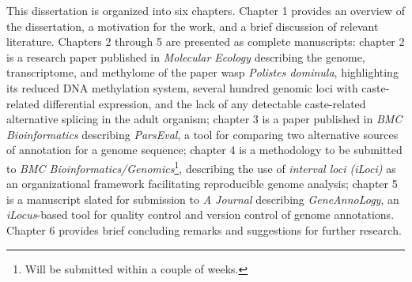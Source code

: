 This dissertation is organized into six chapters.
Chapter 1 provides an overview of the dissertation, a motivation for the work, and a brief discussion of relevant literature.
Chapters 2 through 5 are presented as complete manuscripts:
chapter 2 is a research paper published in \textit{Molecular Ecology} describing the genome, transcriptome, and methylome of the paper wasp \textit{Polistes dominula}, highlighting its reduced DNA methylation system, several hundred genomic loci with caste-related differential expression, and the lack of any detectable caste-related alternative splicing in the adult organism;
chapter 3 is a paper published in \textit{BMC Bioinformatics} describing \textit{ParsEval}, a tool for comparing two alternative sources of annotation for a genome sequence;
chapter 4 is a methodology to be submitted to \textit{BMC Bioinformatics/Genomics}\footnote{Will be submitted within a couple of weeks.}, describing the use of \textit{interval loci (iLoci)} as an organizational framework facilitating reproducible genome analysis;
chapter 5 is a manuscript slated for submission to \textit{A Journal} describing \textit{GeneAnnoLogy}, an \textit{iLocus}-based tool for quality control and version control of genome annotations.
Chapter 6 provides brief concluding remarks and suggestions for further research.
